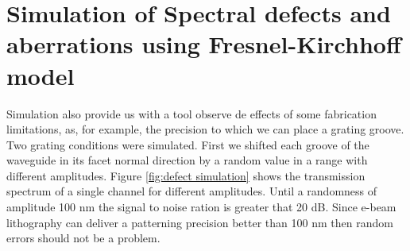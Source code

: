 \documentclass[12pt,twoside,english]{book}
\renewcommand{\~}{\perispomeni}%
\numberwithin{equation}{section}
\numberwithin{figure}{section}
\begin{document}
\section{Simulation of Spectral defects and aberrations using Fresnel-Kirchhoff model}
Simulation also provide us with a tool observe de effects of some fabrication limitations, as, for example, the precision to which we can place a grating groove. Two grating conditions were simulated. First we shifted each groove of the waveguide in its facet normal direction by a random value in a range with different amplitudes. Figure \ref{fig:defect simulation} shows the transmission spectrum of a single channel for different amplitudes. Until a randomness of amplitude 100 nm the signal to noise ration is greater that 20 dB. Since e-beam lithography can deliver a patterning precision better than 100 nm then random errors should not be a problem.
\end{document}
